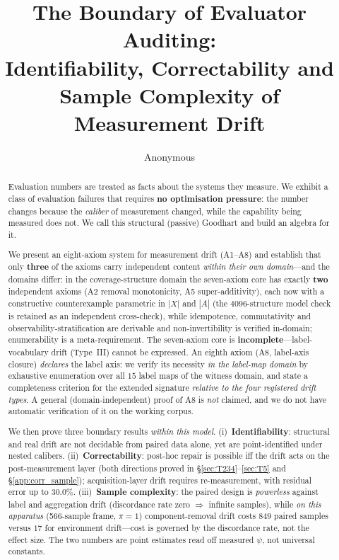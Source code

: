 \documentclass{article}
\title{The Boundary of Evaluator Auditing:\\
Identifiability, Correctability and Sample Complexity of Measurement Drift}
\author{Anonymous}%
\begin{document}
\maketitle

\begin{abstract}
Evaluation numbers are treated as facts about the systems they measure. We exhibit a class of
evaluation failures that requires \textbf{no optimisation pressure}: the number changes because the
\emph{caliber} of measurement changed, while the capability being measured does not. We call this
structural (passive) Goodhart and build an algebra for it.

We present an eight-axiom system for measurement drift (A1--A8) and establish that only \textbf{three}
of the axioms carry independent content \emph{within their own domain}---and the domains differ: in the
coverage-structure domain the seven-axiom core has exactly \textbf{two} independent axioms (A2 removal
monotonicity, A5 super-additivity), each now with a constructive counterexample parametric in $|X|$ and
$|A|$ (the $4096$-structure model check is retained as an independent cross-check), while idempotence,
commutativity and observability-stratification are derivable
and non-invertibility is verified in-domain; enumerability is a meta-requirement. The seven-axiom core is
\textbf{incomplete}---label-vocabulary drift (Type~III) cannot be expressed. An eighth axiom
(A8, label-axis closure) \emph{declares} the label axis: we verify its necessity
\emph{in the label-map domain} by exhaustive enumeration over all $15$ label maps of the witness
domain, and state a completeness criterion for the extended signature \emph{relative to the four
registered drift types}. A general (domain-independent) proof of A8 is \emph{not} claimed, and we do
not have automatic verification of it on the working corpus.

We then prove three boundary results \emph{within this model}. (i)~\textbf{Identifiability}: structural and real drift are not
decidable from paired data alone, yet are point-identified under nested calibers. (ii)~\textbf{Correctability}:
post-hoc repair is possible iff the drift acts on the post-measurement layer (both directions proved
in \S\ref{sec:T234}--\ref{sec:T5} and \S\ref{app:corr_sample}); acquisition-layer
drift requires re-measurement, with residual error up to $30.0\%$. (iii)~\textbf{Sample complexity}: the
paired design is \emph{powerless} against label and aggregation drift (discordance rate zero
$\Rightarrow$ infinite samples), while \emph{on this apparatus} (566-sample frame, $\pi{=}1$) component-removal
drift costs $849$ paired samples versus $17$ for
environment drift---cost is governed by the discordance rate, not the effect size. The two numbers are
point estimates read off measured $\psi$, not universal constants.


\end{abstract}
\end{document}
